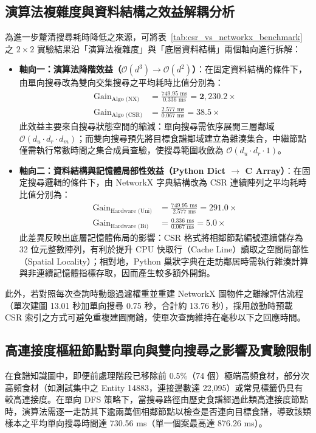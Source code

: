 \subsection{演算法複雜度與資料結構之效益解耦分析}
為進一步釐清搜尋耗時降低之來源，可將表~\ref{tab:csr_vs_networkx_benchmark} 之 $2 \times 2$ 實驗結果沿「演算法複雜度」與「底層資料結構」兩個軸向進行拆解：
\begin{itemize}
    \item \textbf{軸向一：演算法降階效益（$\mathcal{O}(d^3) \to \mathcal{O}(d^2)$）}：在固定資料結構的條件下，由單向搜尋改為雙向交集搜尋之平均耗時比值分別為：
    \begin{align}
      \text{Gain}_{\text{Algo (NX)}} &= \frac{749.95\text{ ms}}{0.336\text{ ms}} = \mathbf{2,230.2\times} \\
      \text{Gain}_{\text{Algo (CSR)}} &= \frac{2.577\text{ ms}}{0.067\text{ ms}} = \mathbf{38.5\times}
    \end{align}
    此效益主要來自搜尋狀態空間的縮減：單向搜尋需依序展開三層鄰域 $\mathcal{O}(d_u \cdot d_r \cdot d_m)$；而雙向搜尋預先將目標食譜鄰域建立為雜湊集合，中繼節點僅需執行常數時間之集合成員查驗，使搜尋範圍收斂為 $\mathcal{O}(d_u \cdot d_r \cdot 1)$。
    \item \textbf{軸向二：資料結構與記憶體局部性效益（Python Dict $\to$ C Array）}：在固定搜尋邏輯的條件下，由 NetworkX 字典結構改為 CSR 連續陣列之平均耗時比值分別為：
    \begin{align}
      \text{Gain}_{\text{Hardware (Uni)}} &= \frac{749.95\text{ ms}}{2.577\text{ ms}} = \mathbf{291.0\times} \\
      \text{Gain}_{\text{Hardware (Bi)}} &= \frac{0.336\text{ ms}}{0.067\text{ ms}} = \mathbf{5.0\times}
    \end{align}
    此差異反映出底層記憶體佈局的影響：CSR 格式將相鄰節點編號連續儲存為 32 位元整數陣列，有利於提升 CPU 快取行（Cache Line）讀取之空間局部性（Spatial Locality）；相對地，Python 巢狀字典在走訪鄰居時需執行雜湊計算與非連續記憶體指標存取，因而產生較多額外開銷。
\end{itemize}
此外，若對照每次查詢時動態過濾權重並重建 NetworkX 圖物件之離線評估流程（單次建圖 13.01 秒加單向搜尋 0.75 秒，合計約 13.76 秒），採用啟動時預載 CSR 索引之方式可避免重複建圖開銷，使單次查詢維持在毫秒以下之回應時間。

\subsection{高連接度樞紐節點對單向與雙向搜尋之影響及實驗限制}
在食譜知識圖中，即便前處理階段已移除前 0.5\%（74 個）極端高頻食材，部分次高頻食材（如測試集中之 Entity 14883，連接邊數達 22,095）或常見標籤仍具有較高連接度。在單向 DFS 策略下，當搜尋路徑由歷史食譜經過此類高連接度節點時，演算法需逐一走訪其下逾兩萬個相鄰節點以檢查是否連向目標食譜，導致該類樣本之平均單向搜尋時間達 730.56 ms（單一個案最高達 876.26 ms）。

